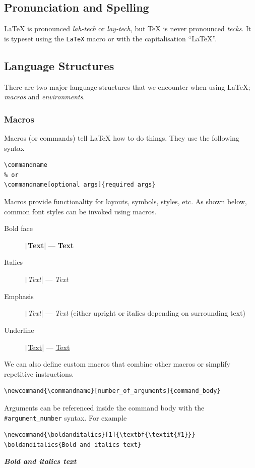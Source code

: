 \documentclass[11pt, twoside]{article}
\begin{document}
\subsection{Pronunciation and Spelling}
\LaTeX{} is pronounced \emph{lah-tech} or \emph{lay-tech}, but \TeX{} is never pronounced \emph{tecks}. It is typeset using the \texttt{\LaTeX{}} macro or with the capitalisation ``LaTeX''.
\subsection{Language Structures}
There are two major language structures that we encounter when using \LaTeX{}; \textit{macros} and \textit{environments}.
\subsubsection{Macros}
Macros (or commands) tell \LaTeX{} how to do things. They use the following syntax
\begin{verbatim}
\commandname
% or
\commandname[optional args]{required args}
\end{verbatim}
Macros provide functionality for layouts, symbols, styles, etc. As shown below, common font styles can be invoked using macros.
\begin{description}
    \item[Bold face] \texttt|\textbf{Text}| --- \textbf{Text}
    \item[Italics] \texttt|\textit{Text}| --- \textit{Text}
    \item[Emphasis] \texttt|\emph{Text}| --- \emph{Text} (either upright or italics depending on surrounding text)
    \item[Underline] \texttt|\underline{Text}| --- \underline{Text}
\end{description}
We can also define custom macros that combine other macros or simplify repetitive instructions.
\begin{verbatim}
\newcommand{\commandname}[number_of_arguments]{command_body}
\end{verbatim}
Arguments can be referenced inside the command body with the \texttt{#argument_number} syntax.
For example
\begin{verbatim}
\newcommand{\boldanditalics}[1]{\textbf{\textit{#1}}}
\boldanditalics{Bold and italics text}
\end{verbatim}
\newcommand{\boldanditalics}[1]{\textbf{\textit{#1}}}
\begin{outputbox}
    \boldanditalics{Bold and italics text}
\end{outputbox}
\end{document}
